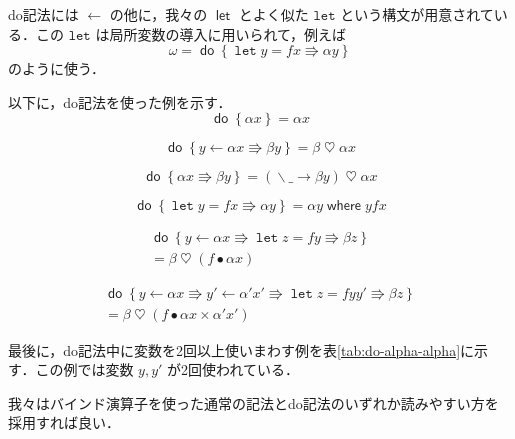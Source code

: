 \documentclass[a4paper,twocolumn]{jsbook}
\def\({\left(\!\left(}
\def\){\right)\!\right)}
\newcommand{\mKeyword}[1]{\mathsf{#1}} %
\newcommand{\mVarKeyword}[1]{\texttt{#1}}
\newcommand{\mDoKeyword}{\mKeyword{do}}
\newcommand{\mDoLetKeyword}{\mVarKeyword{let}}
\newcommand{\mLetKeyword}{\mKeyword{let}}
\newcommand{\mWhereKeyword}{\mKeyword{where}}
\DeclareMathOperator{\mDoKW}{\mDoKeyword}
\DeclareMathOperator{\mLet}{\mLetKeyword} %
\DeclareMathOperator{\mWhere}{\mWhereKeyword}
\newcommand{\mAnyParam}{\_}
\DeclareMathOperator{\mAppMap}{\times}
\DeclareMathOperator{\mBind}{\heartsuit}
\DeclareMathOperator{\mDoEq}{\leftarrow}
\DeclareMathOperator{\mDoLetEq}{\mVarKeyword{=}}
\DeclareMathOperator{\mDoNext}{\Rrightarrow}%
\DeclareMathOperator{\mLambda}{\backslash}
\DeclareMathOperator{\mLambdaArrow}{\rightarrow}
\DeclareMathOperator{\mLetEq}{\triangleq}
\DeclareMathOperator{\mMap}{\bullet}
\newcommand{\mFuncWith}[1]{\(#1\)}
\newcommand{\mDo}[1]{\mDoKW\left\{#1\right\}}
\newcommand{\mDoLet}[2]{\mathop{\mDoLetKeyword}#1\mDoLetEq#2}
\newcommand{\mLambdaExp}[2]{\mLambda{#1}\mLambdaArrow{#2}}
\newcommand{\mWhere}[2]{\mathbin{\mWhereKeyword}#1\mLetEq#2}
\begin{document}
do記法には $\mDoEq$ の他に，我々の $\mLet$ とよく似た $\mDoLetKeyword$ という構文が用意されている．この $\mDoLetKeyword$ は局所変数の導入に用いられて，例えば
\begin{equation}
\omega=\mDo{\mDoLet{y}{fx}\mDoNext\alpha y}
\end{equation}
のように使う．

以下に，do記法を使った例を示す．
\begin{equation}
\mDo{\alpha x}=\alpha x
\end{equation}

\begin{equation}
\mDo{y\mDoEq\alpha x\mDoNext\beta y}=\beta\mBind\alpha x
\end{equation}

\begin{equation}
\mDo{\alpha x\mDoNext\beta y}=(\mLambdaExp{\mAnyParam}{\beta y})\mBind \alpha x\label{eq:do-alpha-beta}
\end{equation}

\begin{equation}
\mDo{\mDoLet{y}{fx}\mDoNext\alpha y}=\alpha y\mWhere{y}{fx}
\end{equation}

\begin{multline}
\mDo{y\mDoEq\alpha x\mDoNext\mDoLet{z}{fy}\mDoNext\beta z}\\
=\beta\mBind{}(f\mMap\alpha x)
\end{multline}

\begin{multline}
\mDo{y\mDoEq\alpha x\mDoNext y'\mDoEq\alpha'x'\mDoNext\mDoLet{z}{fyy'}\mDoNext\beta z}\\
=\beta\mBind{}(f\mMap\alpha x\mAppMap\alpha'x')
\end{multline}



最後に，do記法中に変数を2回以上使いまわす例を表\ref{tab:do-alpha-alpha}に示す．この例では変数 $y,y'$ が2回使われている．

我々はバインド演算子を使った通常の記法とdo記法のいずれか読みやすい方を採用すれば良い．


\end{document}
